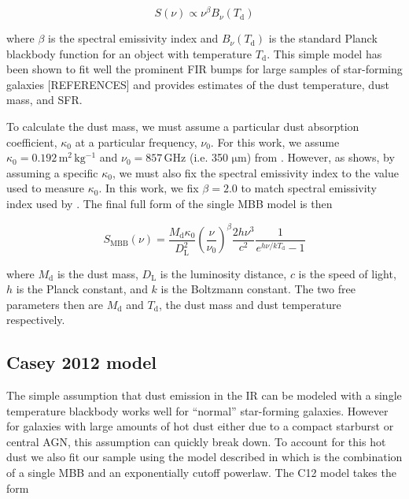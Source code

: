 \documentclass[fleqn,usenatbib]{mnras}
\newcommand{\um}{$\mathrm{\mu}$m}
\begin{document}
\begin{equation}
S(\nu) \propto \nu^{\beta}B_{\nu}(T_{\mathrm{d}})
\end{equation}

\noindent where $\beta$ is the spectral emissivity index and $B_{\nu}(T_{\mathrm{d}})$ is the standard Planck blackbody function for an object with temperature $T_{\mathrm{d}}$. This simple model has been shown to fit well the prominent FIR bumps for large samples of star-forming galaxies [REFERENCES] and provides estimates of the dust temperature, dust mass, and SFR.

To calculate the dust mass, we must assume a particular dust absorption coefficient, $\kappa_{0}$ at a particular frequency, $\nu_{0}$. For this work, we assume $\kappa_{0}=0.192\,\mathrm{m^{2}\,kg^{-1}}$ and $\nu_{0}=857\,\mathrm{GHz}$ (i.e. 350 \um) from \citet{Draine:2003gd}. However, as \citet{Bianchi:2013jk} shows, by assuming a specific $\kappa_{0}$, we must also fix the spectral emissivity index to the value used to measure $\kappa_{0}$. In this work, we fix $\beta=2.0$ to match spectral emissivity index used by \citet{Draine:2003gd}. The final full form of the single MBB model is then

\begin{equation}\label{eq:greybody}
S_{\mathrm{MBB}}(\nu) = \frac{M_{\mathrm{d}}\kappa_{0}}{D_{\mathrm{L}}^2}\left(\frac{\nu}{\nu_{0}}\right)^{\beta}\frac{2h\nu^{3}}{c^{2}}\frac{1}{e^{{h\nu/kT_{\mathrm{d}}}}-1}
\end{equation}

\noindent where $M_{\mathrm{d}}$ is the dust mass, $D_{\mathrm{L}}$ is the luminosity distance, $c$ is the speed of light, $h$ is the Planck constant, and $k$ is the Boltzmann constant. The two free parameters then are $M_{\mathrm{d}}$ and $T_{\mathrm{d}}$, the dust mass and dust temperature respectively.

\subsection{Casey 2012 model}
The simple assumption that dust emission in the IR can be modeled with a single temperature blackbody works well for ``normal'' star-forming galaxies. However for galaxies with large amounts of hot dust either due to a compact starburst or central AGN, this assumption can quickly break down. To account for this hot dust we also fit our sample using the model described in \citet[][hereafter C12]{Casey:2012jl} which is the combination of a single MBB and an exponentially cutoff powerlaw. The C12 model takes the form
\end{document}
